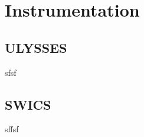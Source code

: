 
\chapter{Instrumentation} %

\label{ChapterInstrumentation} 



\section{ULYSSES}
sfsf
\section{SWICS}
sffsf